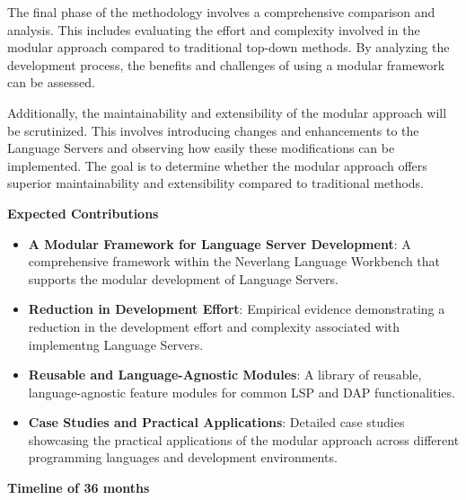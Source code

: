 The final phase of the methodology involves a comprehensive comparison and analysis. This includes evaluating the effort and complexity involved in the modular approach compared to traditional top-down methods. By analyzing the development process, the benefits and challenges of using a modular framework can be assessed.

Additionally, the maintainability and extensibility of the modular approach will be scrutinized. This involves introducing changes and enhancements to the Language Servers and observing how easily these modifications can be implemented. The goal is to determine whether the modular approach offers superior maintainability and extensibility compared to traditional methods.

\hfill \break
\noindent
\textbf{Expected Contributions}

\begin{itemize}
    \item \textbf{A Modular Framework for Language Server Development}: A comprehensive framework within the Neverlang Language Workbench that supports the modular development of Language Servers.
    \item \textbf{Reduction in Development Effort}: Empirical evidence demonstrating a reduction in the development effort and complexity associated with implementng Language Servers.
    \item \textbf{Reusable and Language-Agnostic Modules}: A library of reusable, language-agnostic feature modules for common LSP and DAP functionalities.
    \item \textbf{Case Studies and Practical Applications}: Detailed case studies showcasing the practical applications of the modular approach across different programming languages and development environments.
\end{itemize}


\hfill \break
\noindent
\textbf{Timeline of 36 months}

